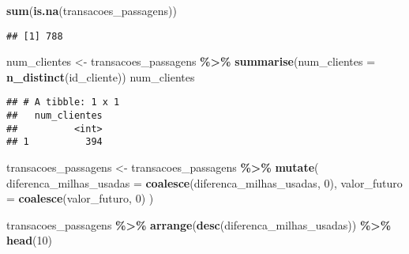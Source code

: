 \documentclass[
]{article}
\newenvironment{Shaded}{\begin{snugshade}}{\end{snugshade}}
\newcommand{\AttributeTok}[1]{\textcolor[rgb]{0.13,0.29,0.53}{#1}}
\newcommand{\DecValTok}[1]{\textcolor[rgb]{0.00,0.00,0.81}{#1}}
\newcommand{\FunctionTok}[1]{\textcolor[rgb]{0.13,0.29,0.53}{\textbf{#1}}}
\newcommand{\NormalTok}[1]{#1}
\newcommand{\OtherTok}[1]{\textcolor[rgb]{0.56,0.35,0.01}{#1}}
\newcommand{\SpecialCharTok}[1]{\textcolor[rgb]{0.81,0.36,0.00}{\textbf{#1}}}
\begin{document}
\begin{Shaded}
\begin{Highlighting}[]
\FunctionTok{sum}\NormalTok{(}\FunctionTok{is.na}\NormalTok{(transacoes\_passagens))}
\end{Highlighting}
\end{Shaded}

\begin{verbatim}
## [1] 788
\end{verbatim}

\begin{Shaded}
\begin{Highlighting}[]
\NormalTok{num\_clientes }\OtherTok{\textless{}{-}}\NormalTok{ transacoes\_passagens }\SpecialCharTok{\%\textgreater{}\%} \FunctionTok{summarise}\NormalTok{(}\AttributeTok{num\_clientes =} \FunctionTok{n\_distinct}\NormalTok{(id\_cliente))}
\NormalTok{num\_clientes}
\end{Highlighting}
\end{Shaded}

\begin{verbatim}
## # A tibble: 1 x 1
##   num_clientes
##          <int>
## 1          394
\end{verbatim}

\begin{Shaded}
\begin{Highlighting}[]
\NormalTok{transacoes\_passagens }\OtherTok{\textless{}{-}}\NormalTok{ transacoes\_passagens }\SpecialCharTok{\%\textgreater{}\%} \FunctionTok{mutate}\NormalTok{(}
  \AttributeTok{diferenca\_milhas\_usadas =} \FunctionTok{coalesce}\NormalTok{(diferenca\_milhas\_usadas, }\DecValTok{0}\NormalTok{),}
  \AttributeTok{valor\_futuro =} \FunctionTok{coalesce}\NormalTok{(valor\_futuro, }\DecValTok{0}\NormalTok{)}
\NormalTok{)}
\end{Highlighting}
\end{Shaded}

\begin{Shaded}
\begin{Highlighting}[]
\NormalTok{transacoes\_passagens }\SpecialCharTok{\%\textgreater{}\%} \FunctionTok{arrange}\NormalTok{(}\FunctionTok{desc}\NormalTok{(diferenca\_milhas\_usadas)) }\SpecialCharTok{\%\textgreater{}\%} \FunctionTok{head}\NormalTok{(}\DecValTok{10}\NormalTok{)}
\end{Highlighting}
\end{Shaded}
\end{document}
